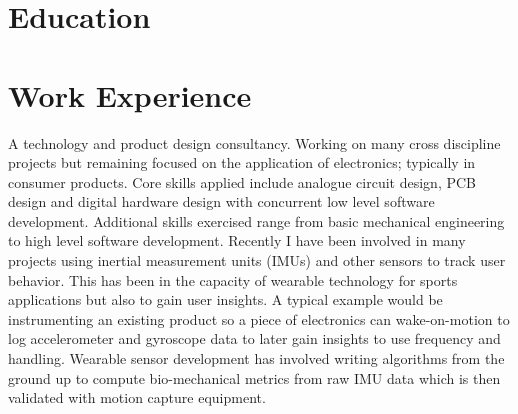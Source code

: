 \documentclass[11pt,a4paper,sans]{moderncv}
\begin{document}
\makecvtitle

\section{Education}


\section{Work Experience}
      {  A technology and product design consultancy. 
         Working on many cross discipline projects but remaining focused on the application of electronics; typically in consumer products.
         Core skills applied include analogue circuit design, PCB design and digital hardware design with concurrent low level software development. 
         Additional skills exercised range from basic mechanical engineering to high level software development.       
Recently I have been involved in many projects using inertial measurement units (IMUs) and other sensors to track user behavior. This has been in the capacity of wearable technology for sports applications but also to gain user insights. A typical example would be instrumenting an existing product so a piece of electronics can wake-on-motion to log accelerometer and gyroscope data to later gain insights to use frequency and handling. Wearable sensor development has involved writing algorithms from the ground up to compute bio-mechanical metrics from raw IMU data which is then validated with motion capture equipment.
      }
\end{document}
